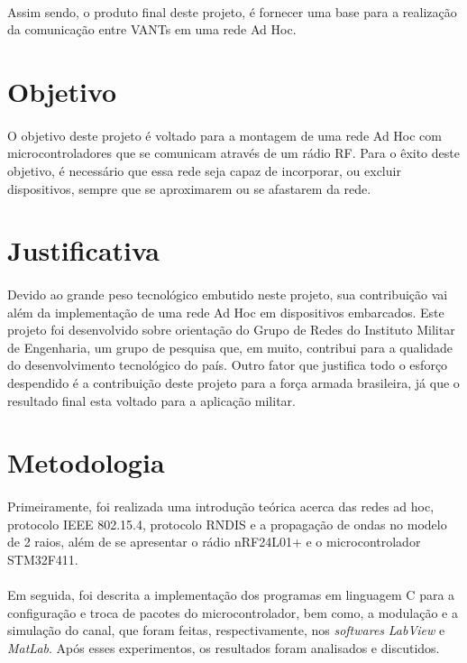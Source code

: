 \paragraph{} Assim sendo, o produto final deste projeto, é fornecer uma base para a realização da comunicação entre VANTs em uma rede Ad Hoc.


\section{Objetivo}
\paragraph{} O objetivo deste projeto é voltado para a montagem de uma rede Ad Hoc com microcontroladores que se comunicam através de um rádio RF. Para o êxito deste objetivo, é necessário que essa rede seja capaz de incorporar, ou excluir dispositivos, sempre que se aproximarem ou se afastarem da rede.  

\section{Justificativa}
\paragraph{} Devido ao grande peso tecnológico embutido neste projeto, sua contribuição vai além da implementação de uma rede Ad Hoc em dispositivos embarcados. Este projeto foi desenvolvido sobre orientação do Grupo de Redes do Instituto Militar de Engenharia, um grupo de pesquisa que, em muito, contribui para a qualidade do desenvolvimento tecnológico do país. Outro fator que justifica todo o esforço despendido é a contribuição deste projeto para a força armada brasileira, já que o resultado final esta voltado para a aplicação militar.


\section{Metodologia}
\paragraph{} Primeiramente, foi realizada uma introdução teórica acerca das redes ad hoc, protocolo IEEE 802.15.4, protocolo RNDIS e a propagação de ondas no modelo de 2 raios, além de se apresentar o rádio nRF24L01+ e o microcontrolador STM32F411.

\paragraph{} Em seguida, foi descrita a implementação dos programas em linguagem C para a configuração e troca de pacotes do microcontrolador, bem como, a modulação e a simulação do canal, que foram feitas, respectivamente, nos \textit{softwares} \textit{LabView} e \textit{MatLab}. Após esses experimentos, os resultados foram analisados e discutidos.

